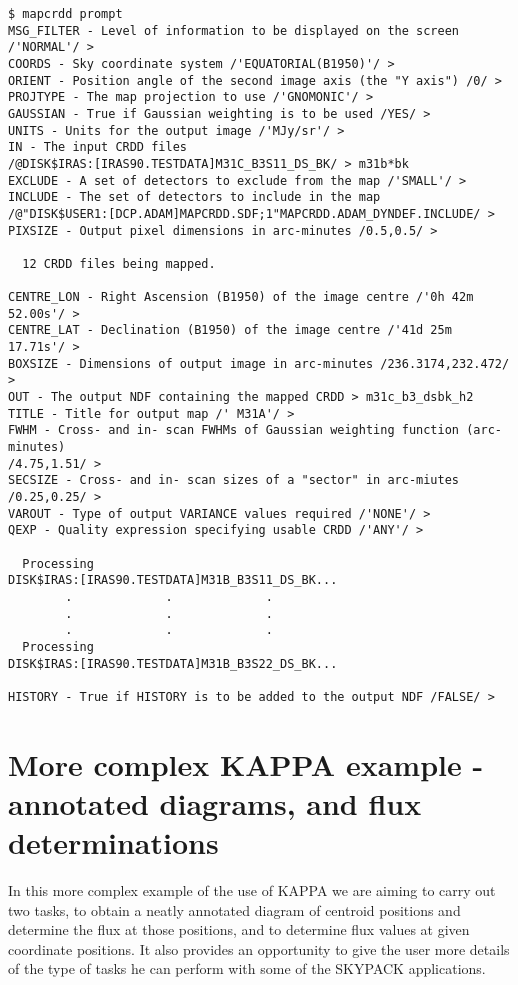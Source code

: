 \begin{small}
\begin{verbatim}
$ mapcrdd prompt
MSG_FILTER - Level of information to be displayed on the screen /'NORMAL'/ > 
COORDS - Sky coordinate system /'EQUATORIAL(B1950)'/ > 
ORIENT - Position angle of the second image axis (the "Y axis") /0/ > 
PROJTYPE - The map projection to use /'GNOMONIC'/ > 
GAUSSIAN - True if Gaussian weighting is to be used /YES/ >
UNITS - Units for the output image /'MJy/sr'/ > 
IN - The input CRDD files
/@DISK$IRAS:[IRAS90.TESTDATA]M31C_B3S11_DS_BK/ > m31b*bk
EXCLUDE - A set of detectors to exclude from the map /'SMALL'/ > 
INCLUDE - The set of detectors to include in the map
/@"DISK$USER1:[DCP.ADAM]MAPCRDD.SDF;1"MAPCRDD.ADAM_DYNDEF.INCLUDE/ >
PIXSIZE - Output pixel dimensions in arc-minutes /0.5,0.5/ > 

  12 CRDD files being mapped.

CENTRE_LON - Right Ascension (B1950) of the image centre /'0h 42m 52.00s'/ > 
CENTRE_LAT - Declination (B1950) of the image centre /'41d 25m 17.71s'/ > 
BOXSIZE - Dimensions of output image in arc-minutes /236.3174,232.472/ > 
OUT - The output NDF containing the mapped CRDD > m31c_b3_dsbk_h2
TITLE - Title for output map /' M31A'/ > 
FWHM - Cross- and in- scan FWHMs of Gaussian weighting function (arc-minutes)
/4.75,1.51/ > 
SECSIZE - Cross- and in- scan sizes of a "sector" in arc-miutes /0.25,0.25/ > 
VAROUT - Type of output VARIANCE values required /'NONE'/ > 
QEXP - Quality expression specifying usable CRDD /'ANY'/ > 

  Processing
DISK$IRAS:[IRAS90.TESTDATA]M31B_B3S11_DS_BK...
        .             .             .
        .             .             .
        .             .             .
  Processing
DISK$IRAS:[IRAS90.TESTDATA]M31B_B3S22_DS_BK...

HISTORY - True if HISTORY is to be added to the output NDF /FALSE/ > 
\end{verbatim}
\end{small}
\newpage
\section{More complex KAPPA example - annotated diagrams, 
and flux determinations}
\label{a:exkappa}
In this more complex example of the use of KAPPA we  are aiming to carry out  
two tasks, to obtain a neatly annotated diagram of centroid positions and
determine the flux at those positions, and to determine flux values at given
coordinate positions. It also provides an opportunity to give the user more
details of the type of tasks he can perform with some of the SKYPACK
applications.

